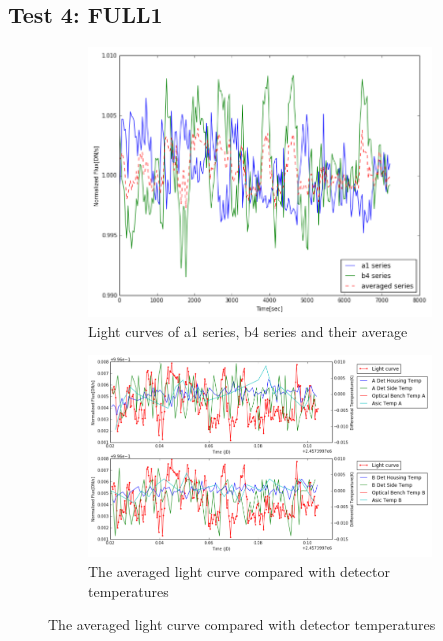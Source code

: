 \documentclass[conference]{IEEEtran}
\begin{document}
\subsection{Test 4: FULL1} 
\begin{figure}[H]
    \centering
    \begin{subfigure}{1}
        \includegraphics[scale=0.4]{ts_test4}
        \caption{Light curves of a1 series, b4 series and their average}
    \end{subfigure}

    \begin{subfigure}{2}
        \includegraphics[scale=0.4]{temp_test4}
        \caption{The averaged light curve compared with detector temperatures}
    \end{subfigure}
   

\end{figure}
\end{document}
